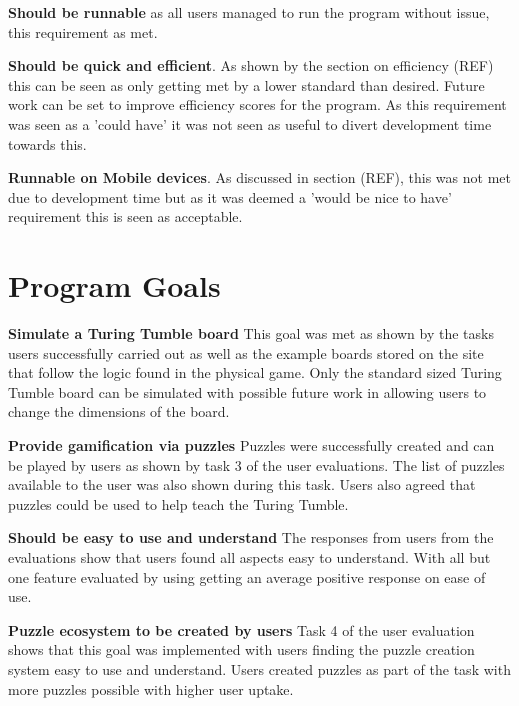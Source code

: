 \documentclass{l4proj}
\begin{document}
\textbf{Should be runnable} as all users managed to run the program without issue, this requirement as met.

\textbf{Should be quick and efficient}. As shown by the section on efficiency (REF) this can be seen as only getting met by a lower standard than desired. Future work can be set to improve efficiency scores for the program. As this requirement was seen as a 'could have' it was not seen as useful to divert development time towards this. 

\textbf{Runnable on Mobile devices}. As discussed in section (REF), this was not met due to development time but as it was deemed a 'would be nice to have' requirement this is seen as acceptable. 

\section{Program Goals}

\textbf{Simulate a Turing Tumble board} This goal was met as shown by the tasks users successfully carried out as well as the example boards stored on the site that follow the logic found in the physical game. Only the standard sized Turing Tumble board can be simulated with possible future work in allowing users to change the dimensions of the board.

\textbf{Provide gamification via puzzles} Puzzles were successfully created and can be played by users as shown by task 3 of the user evaluations. The list of puzzles available to the user was also shown during this task. Users also agreed that puzzles could be used to help teach the Turing Tumble.

\textbf{Should be easy to use and understand} The responses from users from the evaluations show that users found all aspects easy to understand. With all but one feature evaluated by using getting an average positive response on ease of use. 

\textbf{Puzzle ecosystem to be created by users} Task 4 of the user evaluation shows that this goal was implemented with users finding the puzzle creation system easy to use and understand. Users created puzzles as part of the task with more puzzles possible with higher user uptake. 





\end{document}
